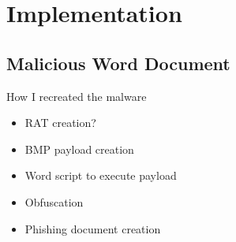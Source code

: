 \chapter{Implementation}
\section{Malicious Word Document}

How I recreated the malware
\begin{itemize}
  \item RAT creation?
  \item BMP payload creation
  \item Word script to execute payload
  \item Obfuscation
  \item Phishing document creation
\end{itemize}

